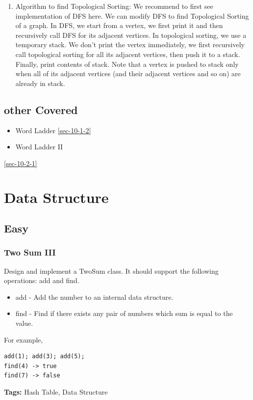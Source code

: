 \documentclass[12pt]{book}
\begin{document}
\begin{enumerate}
\item Algorithm to find Topological Sorting:
\label{sec-18-1-2-3}
We recommend to first see implementation of DFS here. We can modify DFS to find Topological Sorting of a graph. In DFS, we start from a vertex, we first print it and then recursively call DFS for its adjacent vertices. In topological sorting, we use a temporary stack. We don’t print the vertex immediately, we first recursively call topological sorting for all its adjacent vertices, then push it to a stack. Finally, print contents of stack. Note that a vertex is pushed to stack only when all of its adjacent vertices (and their adjacent vertices and so on) are already in stack.
\end{enumerate}
\section{other Covered}
\label{sec-18-2}
\begin{itemize}
\item Word Ladder \ref{sec-10-1-2}
\item Word Ladder II
\end{itemize}
\ref{sec-10-2-1}

\chapter{Data Structure}
\label{sec-19}
\section{Easy}
\label{sec-19-1}
\subsection{Two Sum III}
\label{sec-19-1-1}
Design and implement a TwoSum class. It should support the following operations: add and find.
\begin{itemize}
\item add - Add the number to an internal data structure.
\item find - Find if there exists any pair of numbers which sum is equal to the value.
\end{itemize}
For example,
\lstset{language=java,label= ,caption= ,numbers=none}
\begin{lstlisting}
add(1); add(3); add(5);
find(4) -> true
find(7) -> false
\end{lstlisting}
\textbf{Tags:} Hash Table, Data Structure
\end{document}
